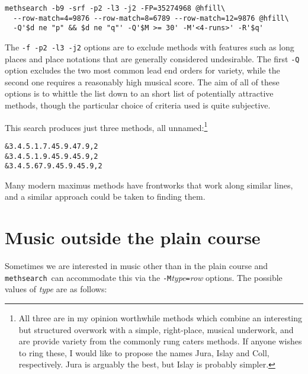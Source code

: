 \documentclass[a4paper,11pt,oneside]{book}
\def\methsearch{\texttt{meth\-search}}
\begin{document}
\begin{Verbatim}[commandchars=@~~]
methsearch -b9 -srf -p2 -l3 -j2 -FP=35274968 @hfill\
  --row-match=4=9876 --row-match=8=6789 --row-match=12=9876 @hfill\
  -Q'$d ne "p" && $d ne "q"' -Q'$M >= 30' -M'<4-runs>' -R'$q'
\end{Verbatim}

The \verb+-f -p2 -l3 -j2+ options are to exclude methods with features
such as long places and place notations that are generally considered
undesirable.  The first \verb+-Q+ option excludes the two most common
lead end orders for variety, while the second one requires a reasonably
high musical score.  The aim of all of these options is to whittle the
list down to an short list of potentially attractive methods, though the
particular choice of criteria used is quite subjective.

This search produces just three methods, all unnamed:\footnote{All
three are in my opinion worthwhile methods which combine an interesting
but structured overwork with a simple, right-place, musical underwork,
and are provide variety from the commonly rung caters methods.  If
anyone wishes to ring these, I would like to propose the names Jura,
Islay and Coll, respectively.  Jura is arguably the best, but Islay is
probably simpler.}

\begin{Verbatim}
&3.4.5.1.7.45.9.47.9,2
&3.4.5.1.9.45.9.45.9,2
&3.4.5.67.9.45.9.45.9,2
\end{Verbatim}

Many modern maximus methods have frontworks that work along similar
lines, and a similar approach could be taken to finding them.

\section{Music outside the plain course}\label{muswhere}

Sometimes we are interested in music other than in the plain course
and \methsearch\ can accommodate this via the 
\verb+-M+\textit{type}\verb+=+\textit{row} options.  The possible
values of \textit{type} are as follows:
\end{document}

